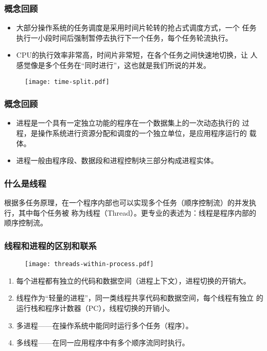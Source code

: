\begin{frame}[fragile]
  \frametitle{概念回顾}

  
  \begin{itemize}
  \item 大部分操作系统的任务调度是采用时间片轮转的抢占式调度方式，一个
    任务执行一小段时间后强制暂停去执行下一个任务，每个任务轮流执行。
  \item CPU的执行效率非常高，时间片非常短，在各个任务之间快速地切换，让
    人感觉像是多个任务在“同时进行”，这也就是我们所说的并发。
  \end{itemize}

  \begin{figure}
    \centering
    \texttt{[image: time-split.pdf]}
  \end{figure}
\end{frame}

\begin{frame}[fragile]
  \frametitle{概念回顾}

  
  \begin{itemize}
  \item 进程是一个具有一定独立功能的程序在一个数据集上的一次动态执行的
    过程，是操作系统进行资源分配和调度的一个独立单位，是应用程序运行的
    载体。
  \item 进程一般由{\hei\Blue 程序段、数据段和进程控制块}三部分构成进程实体。
  \end{itemize}
\end{frame}


\begin{frame}[fragile] %
\frametitle{什么是线程}

根据多任务原理，在一个程序内部也可以实现多个任务（顺序控制流）的并发执行，其中每个任务被
称为线程（Thread）。更专业的表述为：{\hei 线程是程序内部的顺序控制流。}
\end{frame}

\begin{frame}[fragile] %
\frametitle{线程和进程的区别和联系}

  \begin{figure}
    \centering
    \texttt{[image: threads-within-process.pdf]}
  \end{figure}
  \pause
  \begin{enumerate}\small\kai
  \item 每个进程都有独立的代码和数据空间（进程上下文），进程切换的开销大。
  \item 线程作为“轻量的进程”，同一类线程共享代码和数据空间，每个线程有独立
    的运行栈和程序计数器（PC），线程切换的开销小。
  \item 多进程——在操作系统中能同时运行多个任务（程序）。
  \item 多线程——在同一应用程序中有多个顺序流同时执行。
  \end{enumerate}
\end{frame}


